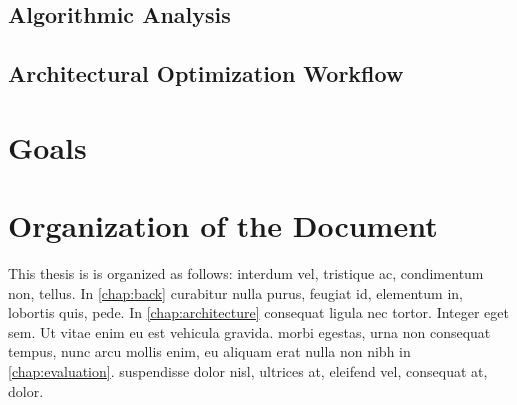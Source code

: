 \subsection{Algorithmic Analysis}

\subsection{Architectural Optimization Workflow}

\section{Goals}

\section{Organization of the Document}
This thesis is is organized as follows:  interdum vel, tristique ac, condimentum non, tellus. 
In \cref{chap:back} curabitur nulla purus, feugiat id, elementum in, lobortis quis, pede.
In \cref{chap:architecture} consequat ligula nec tortor. Integer eget sem. Ut vitae enim eu est vehicula gravida.
 morbi egestas, urna non consequat tempus, nunc arcu mollis enim, eu aliquam erat nulla non nibh in \cref{chap:evaluation}.
 suspendisse dolor nisl, ultrices at, eleifend vel, consequat at, dolor.





